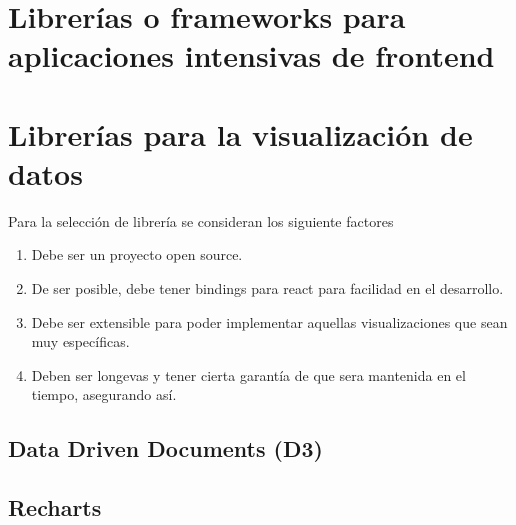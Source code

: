 \section{Librerías o frameworks para aplicaciones intensivas de frontend}



\section{Librerías para la visualización de datos}

Para la selección de librería se consideran los siguiente factores


\begin{enumerate}
    \item {Debe ser un proyecto open source.}
    \item {De ser posible, debe tener bindings para react para facilidad en el desarrollo.}
    \item {Debe ser extensible para poder implementar aquellas visualizaciones que sean muy específicas.}
    \item {Deben ser longevas y tener cierta garantía de que sera mantenida en el tiempo, asegurando así.}
    
\end{enumerate}


\subsection{ Data Driven Documents (D3) }




\subsection{ Recharts }





\subsection{  }





